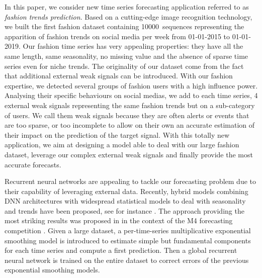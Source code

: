 \documentclass{article} %
\newcommand{\numberts}{10000}
\begin{document}
In this paper, we consider  new time series forecasting application referred to as {\em fashion trends prediction}. Based on a cutting-edge image recognition technology, we built the first fashion dataset containing \numberts\ sequences representing the apparition of fashion trends on social media per week from 01-01-2015 to 01-01-2019. Our fashion time series has very appealing properties: they have all the same length, same seasonality, no missing value and the absence of sparse time series even for niche trends. The originality of our dataset come from the fact that additional external weak signals can be introduced. With our fashion expertise, we detected several groups of fashion users with a high influence power. Analysing their specific behaviours on social medias, we add to each time series, 4 external weak signals representing the same fashion trends but on a sub-category of users. We call them weak signals because they are often alerts or events that are too sparse, or too incomplete to allow on their own an accurate estimation of their impact on the prediction of the target signal. With this totally new application, we aim at designing a model able to deal with our large fashion dataset, leverage our complex external weak signals and finally provide the most accurate forecasts.
 
Recurrent neural networks are appealing to tackle our forecasting problem due to their capability of leveraging external data.  Recently, hybrid models combining DNN architectures with widespread statistical models to deal with seasonality and trends have been proposed, see for instance  \citep{zhang2003time,jianwei2019novel,bandara2020lstm}. The approach providing the most striking results was proposed in  \citep{smyl2020hybrid} in the context of the M4 forecasting competition \citep{makridakis2020m4}.  Given a large dataset, a per-time-series multiplicative exponential smoothing model is introduced to estimate simple but fundamental components for each time series and compute a first prediction. Then a global recurrent neural network is trained on the entire dataset to correct errors of the previous exponential smoothing models. %
\end{document}
